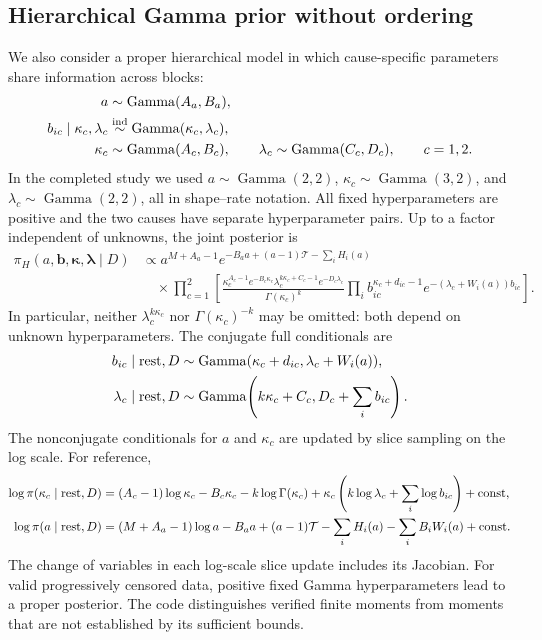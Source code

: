 \documentclass[a4paper,11pt]{article}
\begin{document}
\subsection{Hierarchical Gamma prior without ordering}\label{sec:bayes-hierarchical}
We also consider a proper hierarchical model in which cause-specific parameters share information across blocks:
\begin{align}\label{eq:hierprior}
a&\sim\operatorname{Gamma}(A_a,B_a),\\\notag
b_{ic}\mid\kappa_c,\lambda_c&\stackrel{\mathrm{ind}}\sim\operatorname{Gamma}(\kappa_c,\lambda_c),\\\notag
\kappa_c&\sim\operatorname{Gamma}(A_c,B_c),\qquad
\lambda_c\sim\operatorname{Gamma}(C_c,D_c),\qquad c=1,2.
\end{align}
In the completed study we used $a\sim\operatorname{Gamma}(2,2)$, $\kappa_c\sim\operatorname{Gamma}(3,2)$, and $\lambda_c\sim\operatorname{Gamma}(2,2)$, all in shape--rate notation. All fixed hyperparameters are positive and the two causes have separate hyperparameter pairs. Up to a factor independent of unknowns, the joint posterior is
\begin{align}\label{eq:hierpost}
\pi_H(a,\mathbf b,\boldsymbol\kappa,\boldsymbol\lambda\mid D)
&\propto a^{M+A_a-1}e^{-B_aa+(a-1)\mathcal{T}-\sum_iH_i(a)}\\
&\quad\times\prod_{c=1}^2\left[
\frac{\kappa_c^{A_c-1}e^{-B_c\kappa_c}
\lambda_c^{k\kappa_c+C_c-1}e^{-D_c\lambda_c}}
{\Gamma(\kappa_c)^k}
\prod_i b_{ic}^{\kappa_c+d_{ic}-1}
 e^{-(\lambda_c+W_i(a))b_{ic}}\right].\nonumber
\end{align}
In particular, neither $\lambda_c^{k\kappa_c}$ nor $\Gamma(\kappa_c)^{-k}$ may be omitted: both depend on unknown hyperparameters. The conjugate full conditionals are
\begin{align}\label{eq:hierconditionals}
b_{ic}\mid\mathrm{rest},D&\sim\operatorname{Gamma}(\kappa_c+d_{ic},\lambda_c+W_i(a)),\\\notag
\lambda_c\mid\mathrm{rest},D&\sim\operatorname{Gamma}\!\left(k\kappa_c+C_c,D_c+\sum_i b_{ic}\right).
\end{align}
The nonconjugate conditionals for $a$ and $\kappa_c$ are updated by slice sampling on the log scale. For reference,
\begin{align}\label{eq:hiernonconjugate}
\log\pi(\kappa_c\mid\mathrm{rest},D)
&=(A_c-1)\log\kappa_c-B_c\kappa_c-k\log\Gamma(\kappa_c)
+\kappa_c\left(k\log\lambda_c+\sum_i\log b_{ic}\right)+\mathrm{const},\\\notag
\log\pi(a\mid\mathrm{rest},D)
&=(M+A_a-1)\log a-B_aa+(a-1)\mathcal{T}
-\sum_iH_i(a)-\sum_iB_iW_i(a)+\mathrm{const}.
\end{align}
The change of variables in each log-scale slice update includes its Jacobian. For valid progressively censored data, positive fixed Gamma hyperparameters lead to a proper posterior. The code distinguishes verified finite moments from moments that are not established by its sufficient bounds.
\end{document}
